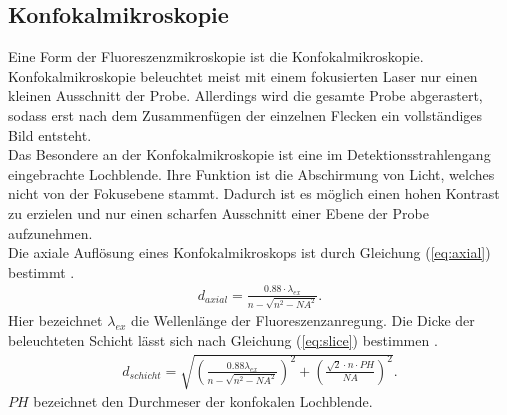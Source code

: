 \subsection{Konfokalmikroskopie}
Eine Form der Fluoreszenzmikroskopie ist die Konfokalmikroskopie. 
Konfokalmikroskopie beleuchtet meist mit einem fokusierten Laser nur einen kleinen Ausschnitt der Probe. 
Allerdings wird die gesamte Probe abgerastert, sodass erst nach dem Zusammenfügen der einzelnen Flecken ein vollständiges Bild entsteht.
\\
Das Besondere an der Konfokalmikroskopie ist eine im Detektionsstrahlengang eingebrachte Lochblende. Ihre Funktion ist die Abschirmung von Licht, welches nicht von der Fokusebene stammt. 
Dadurch ist es möglich einen hohen Kontrast zu erzielen und nur einen scharfen Ausschnitt einer Ebene der Probe aufzunehmen.
\\
Die axiale Auflösung eines Konfokalmikroskops ist durch Gleichung (\ref{eq:axial}) bestimmt \cite{beyer}.
\begin{align}
	d_{axial} = \frac{0.88\cdot \lambda_{ex}}{n-\sqrt{n^2-NA^2}}. \label{eq:axial}
\end{align}
Hier bezeichnet $\lambda_{ex}$ die Wellenlänge der Fluoreszenzanregung. 
Die Dicke der beleuchteten Schicht lässt sich nach Gleichung (\ref{eq:slice}) bestimmen \cite{beyer}.
\begin{align}
	d_{schicht} = \sqrt{\left( \frac{0.88\lambda_{ex}}{n-\sqrt{n^2-NA^2}}\right)^2 + \left( \frac{\sqrt{2}\cdot n \cdot PH}{NA}\right)^2}. \label{eq:slice}
\end{align}
$PH$ bezeichnet den Durchmeser der konfokalen Lochblende.
